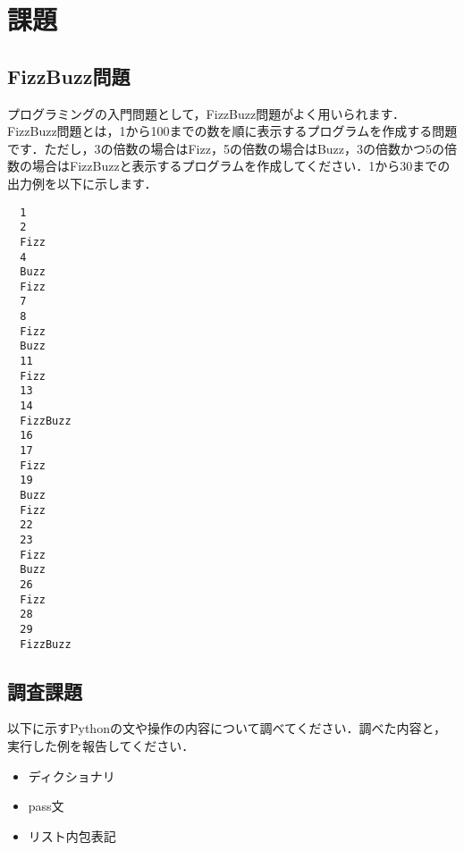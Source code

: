 \documentclass{jarticle}
\begin{document}
\section{課題}
\subsection{FizzBuzz問題}
プログラミングの入門問題として，FizzBuzz問題がよく用いられます．
FizzBuzz問題とは，1から100までの数を順に表示するプログラムを作成する問題です．ただし，3の倍数の場合はFizz，5の倍数の場合はBuzz，3の倍数かつ5の倍数の場合はFizzBuzzと表示するプログラムを作成してください．1から30までの出力例を以下に示します．
\begin{verbatim}
  1
  2
  Fizz
  4
  Buzz
  Fizz
  7
  8
  Fizz
  Buzz
  11
  Fizz
  13
  14
  FizzBuzz
  16
  17
  Fizz
  19
  Buzz
  Fizz
  22
  23
  Fizz
  Buzz
  26
  Fizz
  28
  29
  FizzBuzz
\end{verbatim}

\subsection{調査課題}
以下に示すPythonの文や操作の内容について調べてください．調べた内容と，実行した例を報告してください．
\begin{itemize}
  \item ディクショナリ
  \item pass文
  \item リスト内包表記
\end{itemize}
\end{document}
